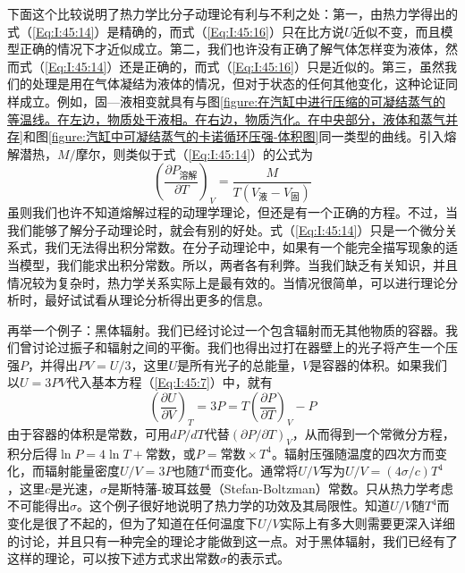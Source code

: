 下面这个比较说明了热力学比分子动理论有利与不利之处：第一，由热力学得出的式（\ref{Eq:I:45:14}）是精确的，而式（\ref{Eq:I:45:16}）只在比方说$U$近似不变，而且模型正确的情况下才近似成立。第二，我们也许没有正确了解气体怎样变为液体，然而式（\ref{Eq:I:45:14}）还是正确的，而式（\ref{Eq:I:45:16}）只是近似的。第三，虽然我们的处理是用在气体凝结为液体的情况，但对于状态的任何其他变化，这种论证同样成立。例如，固—液相变就具有与图\ref{figure:在汽缸中进行压缩的可凝结蒸气的等温线。在左边，物质处于液相。在右边，物质汽化。在中央部分，液体和蒸气并存}和图\ref{figure:汽缸中可凝结蒸气的卡诺循环压强-体积图}同一类型的曲线。引入熔解潜热，$M /\text{摩尔}$，则类似于式（\ref{Eq:I:45:14}）的公式为
\begin{equation*}
    \left(\frac{\partial P_\text{溶解}}{\partial T}\right)_V = \frac{M}{T(V_\text{液} - V_\text{固})}
\end{equation*}
虽则我们也许不知道熔解过程的动理学理论，但还是有一个正确的方程。不过，当我们能够了解分子动理论时，就会有别的好处。式（\ref{Eq:I:45:14}）只是一个微分关系式，我们无法得出积分常数。在分子动理论中，如果有一个能完全描写现象的适当模型，我们能求出积分常数。所以，两者各有利弊。当我们缺乏有关知识，并且情况较为复杂时，热力学关系实际上是最有效的。当情况很简单，可以进行理论分析时，最好试试看从理论分析得出更多的信息。

再举一个例子：黑体辐射。我们已经讨论过一个包含辐射而无其他物质的容器。我们曾讨论过振子和辐射之间的平衡。我们也得出过打在器壁上的光子将产生一个压强$P$，并得出$PV =U /3$，这里$U$是所有光子的总能量，$V$是容器的体积。如果我们以$U =3PV$代入基本方程（\ref{Eq:I:45:7}）中，就有
\begin{equation}
    \label{Eq:I:45:17}
    \left(\frac{\partial U}{\partial V}\right)_T = 3P = T\left(\frac{\partial P}{\partial T}\right)_V - P
\end{equation}
由于容器的体积是常数，可用$dP /dT$代替$(\partial P /\partial T)_V$，从而得到一个常微分方程，积分后得$\ln P =4\ln T +\text{常数}$，或$P=\text{常数}\times T^4$。辐射压强随温度的四次方而变化，而辐射能量密度$U/V =3P$也随$T^4$而变化。通常将$U/V$写为$U /V =(4\sigma /c)T^4$ ，这里$c$是光速，$\sigma$是斯特藩-玻耳兹曼（Stefan-Boltzman）常数。只从热力学考虑不可能得出$\sigma$。这个例子很好地说明了热力学的功效及其局限性。知道$U/V$随$T^4$而变化是很了不起的，但为了知道在任何温度下$U/V$实际上有多大则需要更深入详细的讨论，并且只有一种完全的理论才能做到这一点。对于黑体辐射，我们已经有了这样的理论，可以按下述方式求出常数$\sigma$的表示式。

